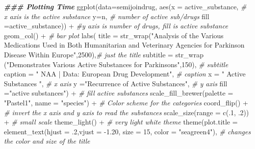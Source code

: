 \documentclass[
]{article}
\newenvironment{Shaded}{\begin{snugshade}}{\end{snugshade}}
\newcommand{\AttributeTok}[1]{\textcolor[rgb]{0.77,0.63,0.00}{#1}}
\newcommand{\CommentTok}[1]{\textcolor[rgb]{0.56,0.35,0.01}{\textit{#1}}}
\newcommand{\DecValTok}[1]{\textcolor[rgb]{0.00,0.00,0.81}{#1}}
\newcommand{\DocumentationTok}[1]{\textcolor[rgb]{0.56,0.35,0.01}{\textbf{\textit{#1}}}}
\newcommand{\FloatTok}[1]{\textcolor[rgb]{0.00,0.00,0.81}{#1}}
\newcommand{\FunctionTok}[1]{\textcolor[rgb]{0.00,0.00,0.00}{#1}}
\newcommand{\NormalTok}[1]{#1}
\newcommand{\SpecialCharTok}[1]{\textcolor[rgb]{0.00,0.00,0.00}{#1}}
\newcommand{\StringTok}[1]{\textcolor[rgb]{0.31,0.60,0.02}{#1}}
\begin{document}
\begin{Shaded}
\begin{Highlighting}[]
\DocumentationTok{\#\#\# Plotting Time}
  \FunctionTok{ggplot}\NormalTok{(}\AttributeTok{data=}\NormalTok{semijoindrug,}
    \FunctionTok{aes}\NormalTok{(}\AttributeTok{x =}\NormalTok{ active\_substance,     }\CommentTok{\# x axis is the active substance}
        \AttributeTok{y=}\NormalTok{n,  }\CommentTok{\# number of active sub/drugs}
        \AttributeTok{fill =}\NormalTok{active\_substance)) }\SpecialCharTok{+}  \CommentTok{\#y axis is number of drugs, fill is active substance}
  \FunctionTok{geom\_col}\NormalTok{() }\SpecialCharTok{+}  \CommentTok{\# bar plot}
  \FunctionTok{labs}\NormalTok{(}
    \AttributeTok{title =} \FunctionTok{str\_wrap}\NormalTok{(}\StringTok{"Analysis of the Various Medications Used in Both Humanitarian and Veterinary Agencies for Parkinson Disease Within Europe"}\NormalTok{,}\DecValTok{2500}\NormalTok{),}\CommentTok{\# just the title}
    \AttributeTok{subtitle =} \FunctionTok{str\_wrap}\NormalTok{ (}\StringTok{"Demonstrates Various Active Substances for Parkinsons"}\NormalTok{,}\DecValTok{150}\NormalTok{),   }\CommentTok{\# subtitle}
    \AttributeTok{caption =} \StringTok{" NAA | Data: European Drug Development"}\NormalTok{, }\CommentTok{\# caption}
    \AttributeTok{x =} \StringTok{" Active Substances "}\NormalTok{, }\CommentTok{\# x axis}
    \AttributeTok{y =}\StringTok{"Recurrence of Active Substances"}\NormalTok{, }\CommentTok{\# y axis}
    \AttributeTok{fill =}\StringTok{"active substances"}\NormalTok{) }\SpecialCharTok{+} \CommentTok{\# fill active substances}
  \FunctionTok{scale\_fill\_brewer}\NormalTok{(}\AttributeTok{palette =} \StringTok{"Pastel1"}\NormalTok{, }\AttributeTok{name =} \StringTok{"species"}\NormalTok{) }\SpecialCharTok{+}   \CommentTok{\# Color scheme for the categories}
  \FunctionTok{coord\_flip}\NormalTok{() }\SpecialCharTok{+} \CommentTok{\# invert the x axis and y axis to read the substances}
  \FunctionTok{scale\_size}\NormalTok{(}\AttributeTok{range =} \FunctionTok{c}\NormalTok{(.}\DecValTok{1}\NormalTok{, .}\DecValTok{2}\NormalTok{)) }\SpecialCharTok{+} \CommentTok{\# small scale}
  \FunctionTok{theme\_light}\NormalTok{() }\SpecialCharTok{+} \CommentTok{\# very light white theme}
  \FunctionTok{theme}\NormalTok{(}\AttributeTok{plot.title =} \FunctionTok{element\_text}\NormalTok{(}\AttributeTok{hjust =}\NormalTok{ .}\DecValTok{2}\NormalTok{,}\AttributeTok{vjust =} \SpecialCharTok{{-}}\FloatTok{1.20}\NormalTok{, }\AttributeTok{size =} \DecValTok{15}\NormalTok{, }\AttributeTok{color =} \StringTok{"seagreen4"}\NormalTok{), }\CommentTok{\# changes the color and size of the title}

\end{Highlighting}
\end{Shaded}
\end{document}
